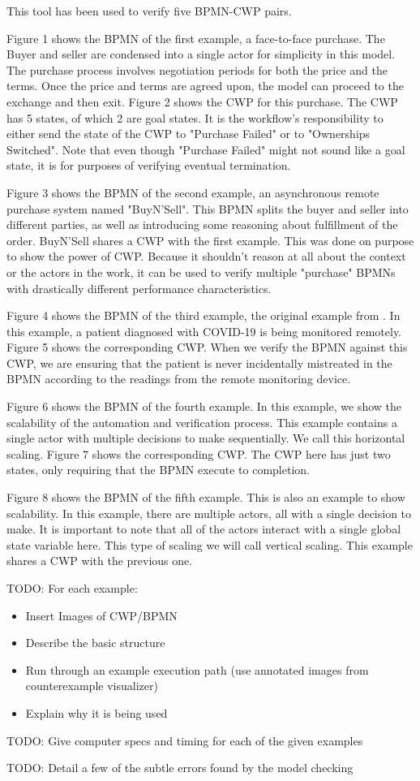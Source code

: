 This tool has been used to verify five BPMN-CWP pairs.

Figure 1 shows the BPMN of the first example, a face-to-face purchase. The Buyer and seller are condensed into a single actor for simplicity in this model. The purchase process involves negotiation periods for both the price and the terms. Once the price and terms are agreed upon, the model can proceed to the exchange and then exit. Figure 2 shows the CWP for this purchase. The CWP has 5 states, of which 2 are goal states. It is the workflow's responsibility to either send the state of the CWP to "Purchase Failed" or to "Ownerships Switched". Note that even though "Purchase Failed" might not sound like a goal state, it is for purposes of verifying eventual termination.

Figure 3 shows the BPMN of the second example, an asynchronous remote purchase system named "BuyN'Sell". This BPMN splits the buyer and seller into different parties, as well as introducing some reasoning about fulfillment of the order. BuyN'Sell shares a CWP with the first example. This was done on purpose to show the power of CWP. Because it shouldn't reason at all about the context or the actors in the work, it can be used to verify multiple "purchase" BPMNs with drastically different performance characteristics.

Figure 4 shows the BPMN of the third example, the original example from \cite{mercer22}. In this example, a patient diagnosed with COVID-19 is being monitored remotely. Figure 5 shows the corresponding CWP. When we verify the BPMN against this CWP, we are ensuring that the patient is never incidentally mistreated in the BPMN according to the readings from the remote monitoring device.

Figure 6 shows the BPMN of the fourth example. In this example, we show the scalability of the automation and verification process. This example contains a single actor with multiple decisions to make sequentially. We call this horizontal scaling. Figure 7 shows the corresponding CWP. The CWP here has just two states, only requiring that the BPMN execute to completion.

Figure 8 shows the BPMN of the fifth example. This is also an example to show scalability. In this example, there are multiple actors, all with a single decision to make. It is important to note that all of the actors interact with a single global state variable here. This type of scaling we will call vertical scaling. This example shares a CWP with the previous one.

TODO: For each example:
\begin{itemize}
    \item Insert Images of CWP/BPMN
    \item Describe the basic structure
    \item Run through an example execution path (use annotated images from counterexample visualizer)
    \item Explain why it is being used
\end{itemize}

TODO: Give computer specs and timing for each of the given examples

TODO: Detail a few of the subtle errors found by the model checking

